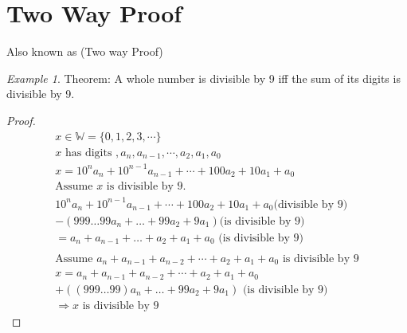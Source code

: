 \documentclass[11pt]{article}
\theoremstyle{remark}
\newtheorem*{example}{Example}
\begin{document}
	\section{Two Way Proof}
	Also known as (Two way Proof) 
	\begin{example}
		Theorem: A whole number is divisible by 9 iff the sum of its digits is divisible by 9.
		\begin{proof}
			\begin{gather}
				x \in \mathbb{W} = \{0, 1, 2, 3, \cdots\}\\ 
				x \text{ has digits }, a_n, a_{n - 1}, \cdots, a_2, a_1, a_0 \\
				x = 10^{n}a_n + 10^{n - 1}a_{n - 1} + \cdots + 100a_2 + 10a_1 + a_0\\
				\text{Assume } x \text{ is divisible by 9.}\\
				10^{n}a_n + 10^{n - 1}a_{n - 1} + \cdots + 100a_2 + 10a_1 + a_0 \text{(divisible by 9)}\\
				- (999\dots 99a_{n} + \dots + 99a_2 + 9a_1) \text{(is divisible by 9)} \\ 
				= a_n + a_{n - 1} + \dots  + a_2 + a_1 + a_0 \text{ (is divisible by 9)}\\ \\
				\text{Assume } a_n + a_{n - 1} + a_{n - 2} + \cdots + a_2 + a_1 + a_0  \text{ is divisible by 9} \\
				x = a_n + a_{n - 1} + a_{n - 2} + \cdots + a_2 + a_1 + a_0  \\
				+ ((999\dots 99)a_n + \dots + 99a_2 + 9a_1) \text{ (is divisible by 9)} \\
				\Rightarrow x \text{ is divisible by 9}
			\end{gather}
		\end{proof}
	\end{example}
	
\end{document}
